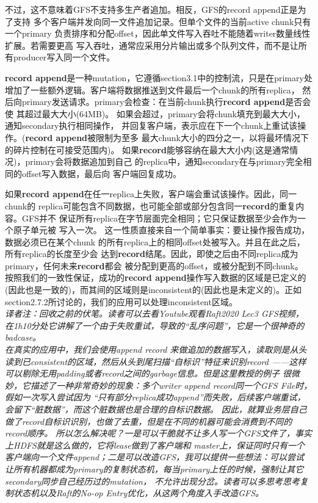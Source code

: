 不过，这不意味着GFS不支持多生产者追加。相反，GFS的record append正是为了支持
多个客户端并发向同一文件追加记录。但单个文件的当前active chunk只有一个primary
负责排序和分配offset，因此单文件写入吞吐不能随着writer数量线性扩展。若需要更高
写入吞吐，通常应采用分片输出或多个队列文件，而不是让所有producer写入同一个文件。
\endgroup

\textbf{record append}是一种mutation，它遵循section3.1中的控制流，只是在primary处
增加了一些额外逻辑。客户端将数据推送到文件最后一个chunk的所有replica，
然后向primary发送请求。primary会检查：在当前chunk执行\textbf{record append}是否会使
其超过最大大小(64MB)。
如果会超过，primary会将chunk填充到最大大小，通知secondary执行相同操作，
并回复客户端，表示应在下一个chunk上重试该操作。(\textbf{record append}被限制为至多
最大chunk大小的四分之一，以将最坏情况下的碎片控制在可接受范围内)。
如果\textbf{record}能够容纳在最大大小内(这是通常情况)，primary会将数据追加到自己
的replica中，通知secondary在与primary完全相同的offset写入数据，最后向
客户端回复成功。

如果\textbf{record append}在任一replica上失败，客户端会重试该操作。因此，同一chunk的
replica可能包含不同数据，也可能全部或部分包含同一\textbf{record}的重复内容。GFS并不
保证所有replica在字节层面完全相同；它只保证数据至少会作为一个原子单元被
写入一次。
这一性质直接来自一个简单事实：要让操作报告成功，数据必须已在某个chunk
的所有replica上的相同offset处被写入。并且在此之后，所有replica的长度至少会
达到\textbf{record}结尾。因此，即使之后由不同replica成为primary，任何未来\textbf{record}都会
被分配到更高的offset，或被分配到不同chunk。
按照我们的一致性保证，成功的\textbf{record append}操作写入数据的区域是已定义的
(因此也是一致的)，而其间的区域则是inconsistent的(因此也是未定义的)。正如
section2.7.2所讨论的，我们的应用可以处理inconsistent区域。
\\\emph{译者注：回收之前的伏笔。读者可以去看Youtube观看Raft2020 Lec3 GFS视频，
在1h10分处它讲解了一个由于失败重试，导致的“乱序问题”，它是一个很神奇的badcase。
\\在真实的应用中，我们会使用append record
来做追加的数据写入，读取则是从头读到已consistent的区域，然后从头到尾扫描“自标识”特征来识别record
——这样可以剔除无用padding或者record之间的garbage信息。但是这里教授的例子
很微妙，它描述了一种非常奇妙的现象：多个writer append record同一个GFS File时，假如一次写入尝试因为
“只有部分replica成功append”而失败，后续客户端重试，会留下“脏数据”，而这个脏数据也是合理的自标识数据。
因此，就算业务层自己做了record自标识识别，也做了去重，但是在不同的机器可能会消费到不同的record顺序。
所以怎么解决呢？一是可以干脆就不让多人写一个GFS文件了，事实上HDFS就是这么做的，它将lease做到了客户端和
master上，保证同时只有一个客户端向一个文件append；二是可以改造GFS，我可以提供一些想法：可以尝试
让所有机器都成为primary的复制状态机，每当primary上任的时候，强制让其它secondary同步自己经历过的mutation，
不允许出现分岔。读者可以多思考思考复制状态机以及Raft的No-op Entry优化，从这两个角度入手改造GFS。}


